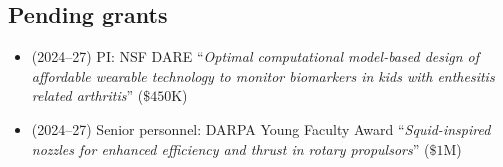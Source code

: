 \subsection{Pending grants}

\begin{itemize}
    \item (2024--27) PI: NSF DARE ``\textit{Optimal computational model-based design of affordable wearable technology to monitor biomarkers in kids with enthesitis related arthritis}'' ($\$450$K)
    \item (2024--27) Senior personnel: DARPA Young Faculty Award ``\textit{Squid-inspired nozzles for enhanced  efficiency and thrust in rotary propulsors}'' ($\$1$M)
\end{itemize}
